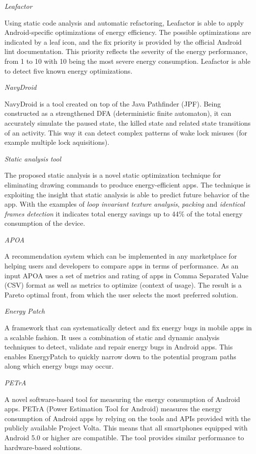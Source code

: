 \documentclass[]{book}
\begin{document}
\emph{Leafactor}

Using static code analysis and automatic refactoring, Leafactor is able
to apply Android-specific optimizations of energy efficiency. The
possible optimizations are indicated by a leaf icon, and the fix
priority is provided by the official Android lint documentation. This
priority reflects the severity of the energy performance, from 1 to 10
with 10 being the most severe energy consumption. Leafactor is able to
detect five known energy optimizations.

\emph{NavyDroid}

NavyDroid is a tool created on top of the Java Pathfinder (JPF). Being
constructed as a strengthened DFA (deterministic finite automaton), it
can accurately simulate the paused state, the killed state and related
state transitions of an activity. This way it can detect complex
patterns of wake lock misuses (for example multiple lock aquisitions).

\emph{Static analysis tool}

The proposed static analysis is a novel static optimization technique
for eliminating drawing commands to produce energy-efficient apps. The
technique is exploiting the insight that static analysis is able to
predict future behavior of the app. With the examples of \emph{loop
invariant texture analysis}, \emph{packing} and \emph{identical frames
detection} it indicates total energy savings up to 44\% of the total
energy consumption of the device.

\emph{APOA}

A recommendation system which can be implemented in any marketplace for
helping users and developers to compare apps in terms of performance. As
an input APOA uses a set of metrics and rating of apps in Comma
Separated Value (CSV) format as well as metrics to optimize (context of
usage). The result is a Pareto optimal front, from which the user
selects the most preferred solution.

\emph{Energy Patch}

A framework that can systematically detect and fix energy bugs in mobile
apps in a scalable fashion. It uses a combination of static and dynamic
analysis techniques to detect, validate and repair energy bugs in
Android apps. This enables EnergyPatch to quickly narrow down to the
potential program paths along which energy bugs may occur.

\emph{PETrA}

A novel software-based tool for measuring the energy consumption of
Android apps. PETrA (Power Estimation Tool for Android) measures the
energy consumption of Android apps by relying on the tools and APIs
provided with the publicly available Project Volta. This means that all
smartphones equipped with Android 5.0 or higher are compatible. The tool
provides similar performance to hardware-based solutions.
\end{document}
